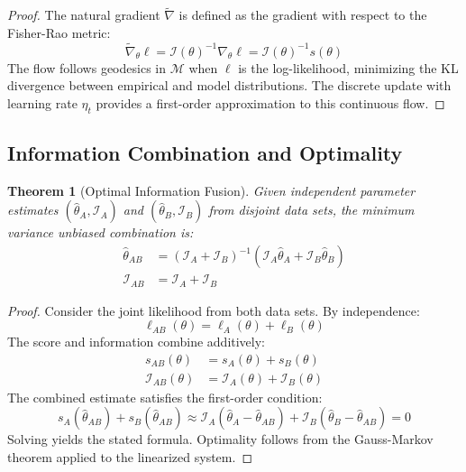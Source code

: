 \documentclass[11pt]{article}
\newtheorem{theorem}{Theorem}
\begin{document}
\begin{proof}
The natural gradient $\tilde{\nabla}$ is defined as the gradient with respect to the Fisher-Rao metric:
\begin{equation}
\tilde{\nabla}_\theta \ell = \mathcal{I}(\theta)^{-1} \nabla_\theta \ell = \mathcal{I}(\theta)^{-1} s(\theta)
\end{equation}
The flow follows geodesics in $\mathcal{M}$ when $\ell$ is the log-likelihood, minimizing the KL divergence between empirical and model distributions. The discrete update with learning rate $\eta_t$ provides a first-order approximation to this continuous flow.
\end{proof}

\subsection{Information Combination and Optimality}

\begin{theorem}[Optimal Information Fusion]
\label{thm:optimal_fusion}
Given independent parameter estimates $(\hat{\theta}_A, \mathcal{I}_A)$ and $(\hat{\theta}_B, \mathcal{I}_B)$ from disjoint data sets, the minimum variance unbiased combination is:
\begin{align}
\hat{\theta}_{AB} &= (\mathcal{I}_A + \mathcal{I}_B)^{-1}(\mathcal{I}_A \hat{\theta}_A + \mathcal{I}_B \hat{\theta}_B)\\
\mathcal{I}_{AB} &= \mathcal{I}_A + \mathcal{I}_B
\end{align}
\end{theorem}

\begin{proof}
Consider the joint likelihood from both data sets. By independence:
\begin{equation}
\ell_{AB}(\theta) = \ell_A(\theta) + \ell_B(\theta)
\end{equation}
The score and information combine additively:
\begin{align}
s_{AB}(\theta) &= s_A(\theta) + s_B(\theta)\\
\mathcal{I}_{AB}(\theta) &= \mathcal{I}_A(\theta) + \mathcal{I}_B(\theta)
\end{align}
The combined estimate satisfies the first-order condition:
\begin{equation}
s_A(\hat{\theta}_{AB}) + s_B(\hat{\theta}_{AB}) \approx \mathcal{I}_A(\hat{\theta}_A - \hat{\theta}_{AB}) + \mathcal{I}_B(\hat{\theta}_B - \hat{\theta}_{AB}) = 0
\end{equation}
Solving yields the stated formula. Optimality follows from the Gauss-Markov theorem applied to the linearized system.
\end{proof}
\end{document}
